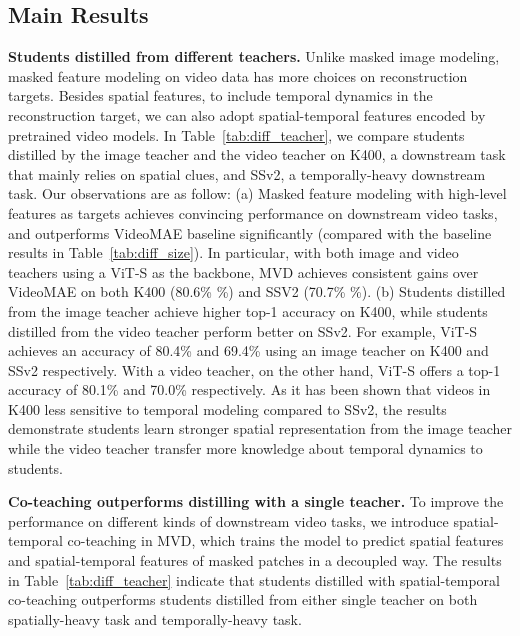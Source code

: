 \documentclass[10pt,twocolumn,letterpaper]{article}
\makeatletter
\newcommand*{\system}{MVD\@\xspace}
\makeatother
\begin{document}
\subsection{Main Results}
\label{sec:main_results}
\noindent \textbf{Students distilled from different teachers.} Unlike masked image modeling, masked feature modeling on video data has more choices on  reconstruction targets. Besides spatial features, to include temporal dynamics in the reconstruction target, we can also adopt spatial-temporal features encoded by pretrained video models. In Table~\ref{tab:diff_teacher}, we compare students distilled by the image teacher and the video teacher on K400, a downstream task that mainly relies on spatial clues, and SSv2, a temporally-heavy downstream task. Our observations are as follow: (a) Masked feature modeling with high-level features as targets achieves convincing performance on downstream video tasks, and outperforms VideoMAE baseline significantly (compared with the baseline results in Table~\ref{tab:diff_size}). In particular, with both image and video teachers using a ViT-S as the backbone, \system achieves consistent gains over VideoMAE on both K400 (80.6\% \%) and SSV2 (70.7\% \%). 
(b) Students distilled from the image teacher achieve higher top-1 accuracy on K400, while students distilled from the video teacher perform better on SSv2.
For example,  ViT-S achieves an accuracy of 80.4\% and 69.4\% using an image teacher on K400 and SSv2 respectively. With a video teacher, on the other hand, ViT-S offers a top-1 accuracy of 80.1\% and 70.0\% respectively. As it has been shown that videos in K400 less sensitive to temporal modeling compared to SSv2,
the results demonstrate students learn stronger spatial representation from the image teacher while the video teacher transfer more knowledge about temporal dynamics to students. 

\vspace{0.05in}
\noindent \textbf{Co-teaching outperforms distilling with a single teacher.} To improve the performance on different kinds of downstream video tasks, we introduce spatial-temporal co-teaching in MVD, which trains the model to predict spatial features and spatial-temporal features of masked patches in a decoupled way. The results in Table~\ref{tab:diff_teacher} indicate that students distilled with spatial-temporal co-teaching outperforms students distilled from either single teacher on both spatially-heavy task and temporally-heavy task.
\end{document}
